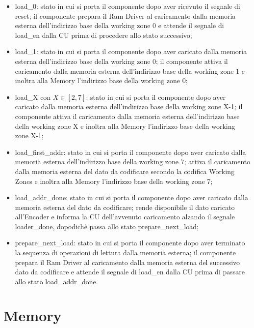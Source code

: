 \documentclass[10pt,english, openany]{book}
\begin{document}
\begin{itemize}
  \item load\_0: stato in cui si porta il componente dopo aver ricevuto il            segnale di reset; il componente prepara il Ram Driver al caricamento          dalla memoria esterna dell’indirizzo base della working zone 0 e attende       il segnale di load\_en dalla CU prima di procedere allo stato                 successivo;
  \item load\_1: stato in cui si porta il componente dopo aver caricato dalla         memoria esterna dell’indirizzo base della working zone 0; il componente       attiva il caricamento dalla memoria esterna dell’indirizzo base della         working zone 1 e inoltra alla Memory l’indirizzo base della working zone       0;
  \item load\_X con $X \in [2, 7]$: stato in cui si porta il componente dopo          aver caricato dalla memoria esterna dell’indirizzo base della working         zone X-1; il componente attiva il caricamento dalla memoria esterna           dell’indirizzo base della working zone X e inoltra alla Memory                l’indirizzo base della working zone X-1;
  \item load\_first\_addr: stato in cui si porta il componente dopo aver              caricato dalla memoria esterna dell’indirizzo base della working zone 7;       attiva il caricamento dalla memoria esterna del dato da codificare            secondo la codifica Working Zones e inoltra alla Memory l’indirizzo base       della working zone 7;
  \item load\_addr\_done: stato in cui si porta il componente dopo aver caricato       dalla memoria esterna del dato da codificare; rende disponibile il dato       caricato all’Encoder e  informa la CU dell’avvenuto caricamento alzando       il segnale loader\_done, dopodichè passa allo stato prepare\_next\_load;
  \item prepare\_next\_load: stato in cui si porta il componente dopo aver            terminato la sequenza di operazioni di lettura dalla memoria esterna; il       componente prepara il Ram Driver al caricamento dalla memoria esterna         del successivo dato da codificare e attende il segnale di load\_en dalla       CU prima di passare allo stato load\_addr\_done.
\end{itemize}

\section{Memory}
\end{document}
